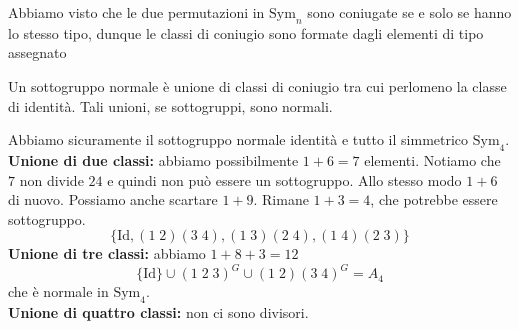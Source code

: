 \documentclass[a4paper]{article}
\begin{document}


Abbiamo visto che le due permutazioni in \(\text{Sym}_n\)
sono coniugate se e solo se hanno lo stesso tipo, dunque le classi di coniugio
sono formate dagli elementi di tipo assegnato


Un sottogruppo normale è unione di classi di coniugio
tra cui perlomeno la classe di identità.
Tali unioni, se sottogruppi, sono normali.

Abbiamo sicuramente il sottogruppo normale identità e tutto il simmetrico \(\text{Sym}_4\).
\textbf{Unione di due classi:} abbiamo possibilmente \(1+6 = 7\)
elementi. Notiamo che \(7\) non divide \(24\) e quindi non può essere un sottogruppo.
Allo stesso modo \(1+6\) di nuovo. Possiamo anche scartare \(1+9\).
Rimane \(1+3=4\), che potrebbe essere sottogruppo.
\[
    \{\text{Id}, (1\;2)(3\;4), (1\;3)(2\;4), (1\;4)(2\;3)\}
\]
\textbf{Unione di tre classi:} abbiamo \(1+8+3 = 12\)
\[
    \{\text{Id}\} \cup {(1\;2\;3)}^G \cup {(1\;2)(3\; 4)}^G = A_4
\]
che è normale in \(\text{Sym}_4\).\\
\textbf{Unione di quattro classi:} non ci sono divisori.
\end{document}
